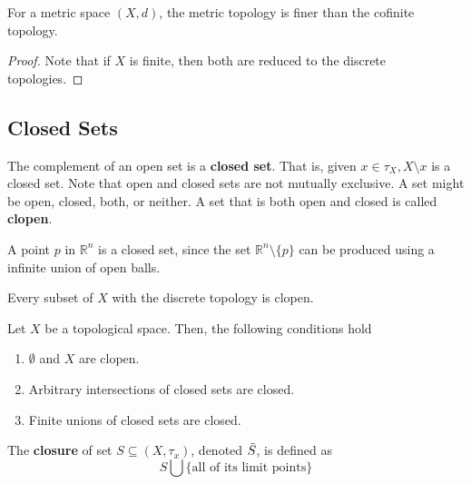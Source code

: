       \begin{theorem}
        For a metric space $(X, d)$, the metric topology is finer than the cofinite topology. 
      \end{theorem} 
      \begin{proof}
        Note that if $X$ is finite, then both are reduced to the discrete topologies. 
      \end{proof}

  \subsection{Closed Sets} 

    \begin{definition}
      The complement of an open set is a \textbf{closed set}. That is, given $x \in \tau_{X}, X \setminus x$ is a closed set. Note that open and closed sets are not mutually exclusive. A set might be open, closed, both, or neither. A set that is both open and closed is called \textbf{clopen}.
    \end{definition}

    \begin{example}[Atoms]
      A point $p$ in $\mathbb{R}^{n}$ is a closed set, since the set $\mathbb{R}^{n} \setminus \{p\}$ can be produced using a infinite union of open balls. 
    \end{example}

    \begin{example}
      Every subset of $X$ with the discrete topology is clopen.
    \end{example}

    \begin{theorem}
      Let $X$ be a topological space. Then, the following conditions hold
      \begin{enumerate}
        \item $\emptyset$ and $X$ are clopen.
        \item Arbitrary intersections of closed sets are closed. 
        \item Finite unions of closed sets are closed. 
      \end{enumerate}
    \end{theorem}

    \begin{definition}
    The \textbf{closure} of set $S \subseteq (X, \tau_{x})$, denoted $\Bar{S}$, is defined as 
    \[ S \bigcup \{\text{all of its limit points}\} \]
    \end{definition}

